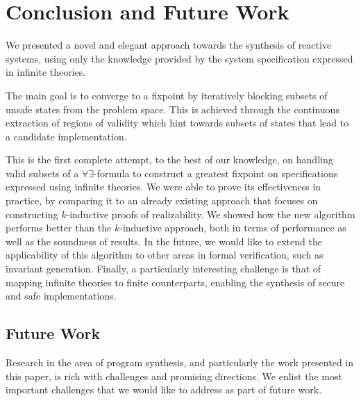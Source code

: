 \section{Conclusion and Future Work}
\label{sec:conclusion}


We presented a novel and elegant approach towards the synthesis
of reactive systems, using only the knowledge provided by the
system specification expressed in infinite theories.
\iffalse
 The approach is
directly inspired from previous work on Property Directed Reachability, with the objective being the construction of inductive
invariants that can be used as a proof to the specification's realizability.
\fi
The main goal is to converge to a fixpoint by iteratively blocking subsets of
unsafe states from the problem space. This is achieved through the continuous
extraction of regions of validity which hint towards subsets of states that
lead to a candidate implementation.

This is the first complete attempt, to the best of our knowledge, on handling
valid subsets of a $\forall\exists$-formula to construct a greatest fixpoint on specifications expressed using infinite theories. We were able to
prove its effectiveness in practice, by comparing it to an already existing
approach that focuses on constructing $k$-inductive proofs of realizability. We showed how the new algorithm performs better than the $k$-inductive approach, both in terms of performance as well as the soundness of results. In the future, we would like to extend the applicability of this algorithm to other areas in formal verification, such as invariant generation. Finally, a particularly interesting challenge is that of mapping infinite theories to finite counterparts, enabling the synthesis of secure and safe implementations.

\iffalse
\subsection{Future Work}
Research in the area of program synthesis, and particularly the work presented in this paper, is rich with challenges and promising directions. We enlist the most important challenges that we would like to address as part of future work.

